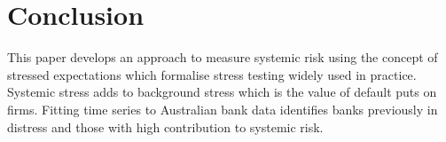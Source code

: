 \documentclass[12pt]{article}
\begin{document}
\section{Conclusion}\label{conclude}


This paper develops an approach to measure systemic risk using the concept of stressed expectations which formalise stress testing widely used in practice. Systemic stress adds to background stress which is the value of default puts on firms. Fitting time series to Australian bank data identifies banks previously in distress and those with high contribution to systemic risk.

\end{document}
